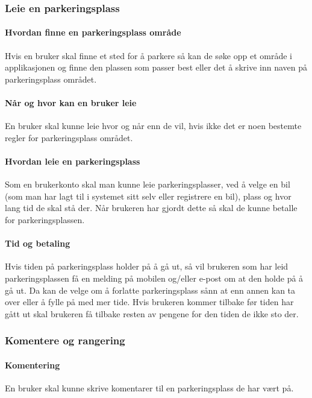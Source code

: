 \documentclass[12pt]{article}
\begin{document}
        \subsubsection{Leie en parkeringsplass}

            \paragraph{Hvordan finne en parkeringsplass område}
            Hvis en bruker skal finne et sted for å parkere så kan de søke opp et område i applikasjonen og finne den plassen som passer best eller det å skrive inn naven på parkeringsplass området.

            \paragraph{Når og hvor kan en bruker leie}
            En bruker skal kunne leie hvor og når enn de vil, hvis ikke det er noen bestemte regler for parkeringsplass området.

            \paragraph{Hvordan leie en parkeringsplass}
            Som en brukerkonto skal man kunne leie parkeringsplasser, ved å velge en bil (som man har lagt til i systemet sitt selv eller registrere en bil), plass og hvor lang tid de skal stå der. Når brukeren har gjordt dette så skal de kunne betalle for parkeringsplassen.

            \paragraph{Tid og betaling}
            Hvis tiden på parkeringsplass holder på å gå ut, så vil brukeren som har leid parkeringsplassen få en melding på mobilen og/eller e-post om at den holde på å gå ut. Da kan de velge om å forlatte parkeringsplass sånn at enn annen kan ta over eller å fylle på med mer tide. Hvis brukeren kommer tilbake før tiden har gått ut skal brukeren få tilbake resten av pengene for den tiden de ikke sto der.

        \subsubsection{Komentere og rangering}

            \paragraph{Komentering}
            En bruker skal kunne skrive komentarer til en parkeringsplass de har vært på. 
\end{document}
